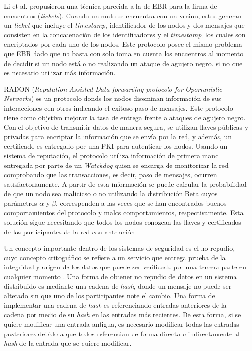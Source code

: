 Li et al. \cite{DBLP:conf/infocom/LiWS09} propusieron una técnica parecida a la
de EBR para la firma de encuentros (\textit{tickets}). Cuando un nodo se
encuentra con un vecino, estos generan un \textit{ticket} que incluye el
\textit{timestamp}, identificador de los nodos y dos mensajes que consisten en
la concatenación de los identificadores y el \textit{timestamp}, los cuales son
encriptados por cada uno de los nodos. Este protocolo posee el mismo problema
que EBR dado que no basta con solo toma en cuenta los encuentros al momento de
decidir si un nodo está o no realizando un ataque de agujero negro, si no que es
necesario utilizar más información.

RADON \cite{Li:2010:RRD:1755743.1755746} (\textit{Reputation-Assisted Data
forwarding protocolo for Oportunistic Networks}) es un protocolo donde los nodos
diseminan información de sus interacciones con otros indicando el exitoso paso
de mensajes. Este protocolo tiene como objetivo mejorar la tasa de entrega
frente a ataques de agujero negro. Con el objetivo de transmitir datos de manera
segura, se utilizan llaves públicas y privadas para encriptar la información que
se envía por la red, y además, un certificado es entregado por una PKI para
autenticar los nodos. Usando un sistema de reputación, el protocolo utiliza
información de primera mano entregada por parte de un \textit{Watchdog} quien se
encarga de monitorizar la red comprobando que las transacciones, es decir, paso
de mensajes, ocurren satisfactoriamente. A partir de esta información se puede
calcular la probabilidad de que un nodo sea malicioso o no utilizando la
distribución Beta cuyos parámetros $\alpha$ y $\beta$, corresponden a las veces
que se han encontrados buenos comportamientos del protocolo y malos
comportamientos, respectivamente. Esta solución sigue necesitando que todos los
nodos conozcan las llaves y certificados de los participantes de la red con
antelación.


Un concepto importante dentro de los sistemas de seguridad es el no repudio,
cuyo concepto critográfico se refiere a un servicio que entrega prueba de la
integridad y origen de los datos que puede ser verificada por una tercera parte
en cualquier momento \cite{Caelli:1991:ISH:129024}. Una forma de obtener no
repudio de datos en un sistema distribuido es mediante una cadena de
\textit{hash}, donde un mensaje no puede ser alterado sin que uno de los
participantes note el cambio. Una forma de implementar una cadena de
\textit{hash} es referenciando entradas anteriores de la cadena por medio de su
\textit{hash} en las entradas más recientes. De esta forma, si se quiere
modificar una entrada antigua, es necesario modificar todas las entradas
posteriores debido a que todos referencian de forma directa o indirectamente al
\textit{hash} de la entrada que se quiere modificar.


